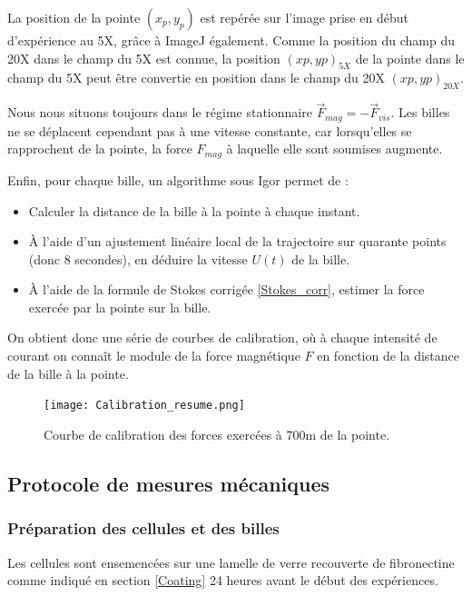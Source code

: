  La position de la pointe $(x_p,y_p)$ est repérée sur l'image prise en début d'expérience au 5X, grâce à ImageJ également. Comme la position du champ du 20X dans le champ du 5X est connue, la position $(xp,yp)_{5X}$ de la pointe dans le champ du 5X peut être convertie en position dans le champ du 20X $(xp,yp)_{20X}$. 
 
 Nous nous situons toujours dans le régime stationnaire $\vec{F}_{mag}=-\vec{F}_{vis}$. 
 Les billes ne se déplacent cependant pas à une vitesse constante, car lorsqu'elles se rapprochent de la pointe, la force $F_{mag}$ à laquelle elle sont soumises augmente. 
 
 Enfin, pour chaque bille, un algorithme sous Igor permet de : 
 \begin{itemize}
 \item Calculer la distance de la bille à la pointe à chaque instant.
 \item \`A l'aide d'un ajustement linéaire local de la trajectoire sur quarante points (donc 8 secondes), en déduire la vitesse $U(t)$ de la bille.
 \item \`A l'aide de la formule de Stokes corrigée \ref{Stokes_corr}, estimer la force exercée par la pointe sur la bille.
 \end{itemize}
 
 On obtient donc une série de courbes de calibration, où à chaque intensité de courant on connaît le module de la force magnétique $F$ en fonction de la distance de la bille à la pointe. 
 
 \begin{figure}
 \texttt{[image: Calibration\_resume.png]}
 \caption{Courbe de calibration des forces exercées à 700\micro m de la pointe.}
 \end{figure}
	
	
	\subsection{Protocole de mesures mécaniques}
	\subsubsection{Préparation des cellules et des billes}
	
	Les cellules sont ensemencées sur une lamelle de verre recouverte de fibronectine comme indiqué en section \ref{Coating} 24 heures avant le début des expériences. 
	
